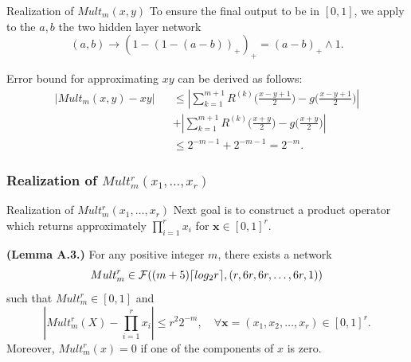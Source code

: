 \documentclass{if-beamer}
\DeclarePairedDelimiter{\ceil}{\lceil}{\rceil}
\begin{document}
\begin{frame}{Realization of $Mult_{m}(x,y)$}
To ensure the final output to be in $[0,1]$, we apply to the $a, b$ the two hidden layer network 
\begin{equation*}
    (a,b)\rightarrow{(1-(1-(a-b))_{+})_{+}}=(a-b)_{+}\wedge 1.
\end{equation*}

Error bound for approximating $xy$ can be derived as follows:
\begin{eqnarray*}
    \left|Mult_{m}(x,y)-xy\right| &&\leq \left| \sum_{k=1}^{m+1}R^{(k)}\bigg(\frac{x-y+1}{2}\bigg) - g\bigg( \frac{x-y+1}{2} \bigg) \right| \\
    && + \left| \sum_{k=1}^{m+1}R^{(k)}\bigg(\frac{x+y}{2}\bigg) - g\bigg( \frac{x+y}{2} \bigg) \right| \\
    && \leq 2^{-m-1}+2^{-m-1} = 2^{-m}.
\end{eqnarray*}
\end{frame}

\subsubsection{Realization of $Mult_{m}^{r}(x_{1},\dots,x_{r})$}
\begin{frame}{Realization of $Mult_{m}^{r}(x_{1},\dots,x_{r})$}
Next goal is to construct a product operator which returns approximately $\prod_{i=1}^{r}x_{i}$ for $\textbf{x}\in[0,1]^{r}$.

\begin{tcolorbox}
    \textbf{(Lemma A.3.)}
    For any positive integer $m$, there exists a network 
    \begin{equation*}
        Mult_m^{r} \in \mathcal{F}( (m+5)\ceil{log_{2}r},(r,6r,6r,\dots,6r,1))
    \end{equation*}
    such that $Mult_m^{r}\in[0,1]$ and
    \begin{equation*}
        \left| Mult_m^{r}(X) - \prod_{i=1}^{r}x_{i} \right| \leq r^{2}2^{-m},
        \quad \forall \textbf{x}=(x_{1},x_{2},\dots,x_{r})\in[0,1]^{r}.
    \end{equation*}
    Moreover, $Mult_m^{r}(x)=0$ if one of the components of $x$ is zero.
\end{tcolorbox}

\end{frame}
\end{document}
